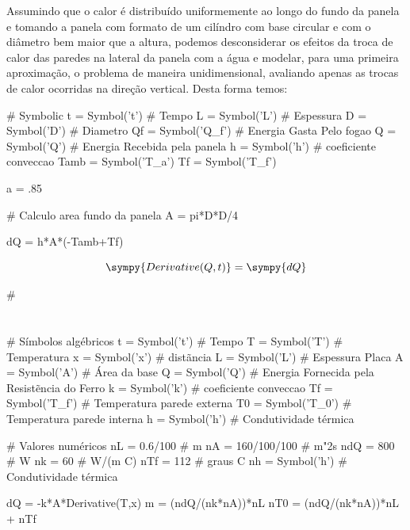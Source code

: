 \documentclass[a4paper,11pt]{article}
\begin{document}
Assumindo que o calor é distribuído uniformemente ao longo do fundo da panela e tomando a panela com formato de um cilíndro com base circular e com o diâmetro bem maior que a altura, podemos desconsiderar os efeitos da troca de calor das paredes na lateral da panela com a água e modelar, para uma primeira aproximação, o problema de maneira unidimensional, avaliando apenas as trocas de calor ocorridas na direção vertical. Desta forma temos:

\begin{sympycode}
# Symbolic
t = Symbol('t') # Tempo
L = Symbol('L') # Espessura
D = Symbol('D') # Diametro
Qf = Symbol('Q_f') # Energia Gasta Pelo fogao
Q = Symbol('Q') # Energia Recebida pela panela
h = Symbol('h') # coeficiente conveccao
Tamb = Symbol('T_a')
Tf = Symbol('T_f')


a = .85

# Calculo area fundo da panela
A = pi*D*D/4

dQ = h*A*(-Tamb+Tf)
\end{sympycode}

\begin{equation}
 \sympy{Derivative(Q,t)} = \sympy{dQ}
\end{equation}

\begin{sympycode}
#
\end{sympycode}
\section{}

\begin{sympycode}
# Símbolos algébricos
t = Symbol('t') # Tempo
T = Symbol('T') # Temperatura
x = Symbol('x') # distãncia
L = Symbol('L') # Espessura Placa
A = Symbol('A') # Área da base
Q = Symbol('Q') # Energia Fornecida pela Resistẽncia do Ferro
k = Symbol('k') # coeficiente conveccao
Tf = Symbol('T_f') # Temperatura parede externa
T0 = Symbol('T_0') # Temperatura parede interna
h = Symbol('h') # Condutividade térmica

# Valores numéricos
nL = 0.6/100 # m
nA = 160/100/100 # m"2s
ndQ = 800 # W
nk = 60 # W/(m C)
nTf = 112 # graus C
nh = Symbol('h') # Condutividade térmica

dQ = -k*A*Derivative(T,x)
m = (ndQ/(nk*nA))*nL
nT0 = (ndQ/(nk*nA))*nL + nTf
\end{sympycode}
\end{document}
